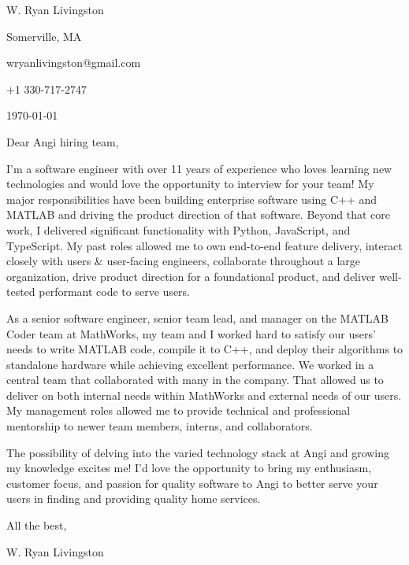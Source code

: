 \documentclass[
    10pt %
]{article}
\begin{document}
\begin{minipage}{\linewidth}
W. Ryan Livingston

Somerville, MA

wryanlivingston@gmail.com

+1 330-717-2747

\today
\end{minipage}


Dear Angi hiring team,

I'm a software engineer with over 11 years of experience who loves learning new technologies and would love the opportunity to interview for your team! My major responsibilities have been building enterprise software using C++ and MATLAB and driving the product direction of that software. Beyond that core work, I delivered significant functionality with Python, JavaScript, and TypeScript. My past roles allowed me to own end-to-end feature delivery, interact closely with users \& user-facing engineers, collaborate throughout a large organization, drive product direction for a foundational product, and deliver well-tested performant code to serve users.

As a senior software engineer, senior team lead, and manager on the MATLAB Coder team at MathWorks, my team and I worked hard to satisfy our users' needs to write MATLAB code, compile it to C++, and deploy their algorithms to standalone hardware while achieving excellent performance. We worked in a central team that collaborated with many in the company. That allowed us to deliver on both internal needs within MathWorks and external needs of our users. My management roles allowed me to provide technical and professional mentorship to newer team members, interns, and collaborators.

The possibility of delving into the varied technology stack at Angi and growing my knowledge excites me! I'd love the opportunity to bring my enthusiasm, customer focus, and passion for quality software to Angi to better serve your users in finding and providing quality home services.

All the best,

W. Ryan Livingston
\end{document}
